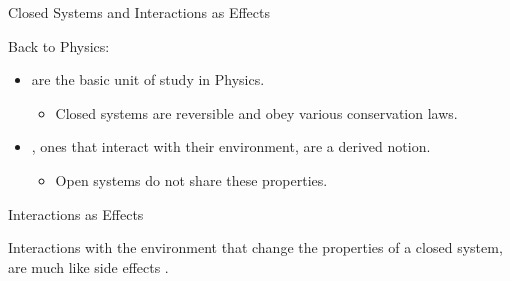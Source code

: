 \documentclass[svgnames,11pt]{beamer}
\newcommand{\red}[1]{{\color{red}{#1}}}
\begin{document}
\begin{frame}{Closed Systems and Interactions as Effects}

Back to Physics:

  \begin{itemize}

\vfill
\item \red{Closed systems} are the basic unit of study in Physics.

  \begin{itemize}
  \item Closed systems are reversible and obey various conservation
  laws.

  \end{itemize}

\vfill
\item \red{Open systems}, ones that interact with their environment,
  are a derived notion.

  \begin{itemize}
  \item Open systems do not share these properties.

  \end{itemize}


\vfill

  \end{itemize}

\end{frame}

\begin{frame}

  \begin{block}{Interactions as Effects}

Interactions with the environment that change the properties of a
closed system, are much like side effects .
  \end{block}

\end{frame}
\end{document}
